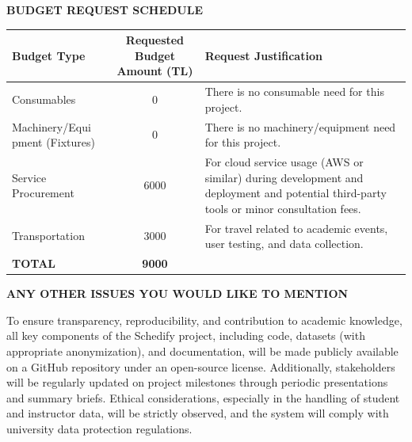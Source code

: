 \documentclass[10pt,a4paper]{article}
\newcommand{\sectionlabel}[1]{\vspace{1.2em}\noindent\textbf{\fontsize{10.5}{12}\selectfont #1}\par\vspace{0.4em}}
\begin{document}
\sectionlabel{BUDGET REQUEST SCHEDULE}
\begin{tabularx}{\textwidth}{|P{0.3\textwidth}|c|Y|}
\hline
\textbf{Budget Type} & \textbf{Requested Budget Amount (TL)} & \textbf{Request Justification} \\ \hline
Consumables & 0 & There is no consumable need for this project. \\ \hline
Machinery/Equi pment (Fixtures) & 0 & There is no machinery/equipment need for this project. \\ \hline
Service Procurement & 6000 & For cloud service usage (AWS or similar) during development and deployment and potential third-party tools or minor consultation fees. \\ \hline
Transportation & 3000 & For travel related to academic events, user testing, and data collection. \\ \hline
\textbf{TOTAL} & \textbf{9000} &  \\ \hline
\end{tabularx}

\sectionlabel{ANY OTHER ISSUES YOU WOULD LIKE TO MENTION}
To ensure transparency, reproducibility, and contribution to academic knowledge, all key components of the Schedify project, including code, datasets (with appropriate anonymization), and documentation, will be made publicly available on a GitHub repository under an open-source license. Additionally, stakeholders will be regularly updated on project milestones through periodic presentations and summary briefs. Ethical considerations, especially in the handling of student and instructor data, will be strictly observed, and the system will comply with university data protection regulations.
\end{document}
